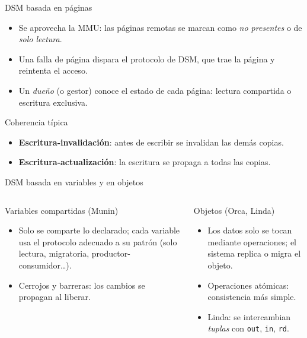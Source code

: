 \documentclass[aspectratio=169,11pt]{beamer}
\begin{document}
\begin{frame}{DSM basada en páginas}
  \begin{itemize}
    \item Se aprovecha la MMU: las páginas remotas se marcan como \emph{no presentes} o de \emph{solo lectura}.
    \item Una falla de página dispara el protocolo de DSM, que trae la página y reintenta el acceso.
    \item Un \emph{dueño} (o gestor) conoce el estado de cada página: lectura compartida o escritura exclusiva.
  \end{itemize}
  \begin{block}{\enspace Coherencia típica}
    \begin{itemize}
      \item \textbf{Escritura-invalidación}: antes de escribir se invalidan las demás copias.
      \item \textbf{Escritura-actualización}: la escritura se propaga a todas las copias.
    \end{itemize}
  \end{block}
\end{frame}

\begin{frame}{DSM basada en variables y en objetos}
  \begin{columns}[T]
    \begin{block}{\faTag\enspace Variables compartidas (Munin)}
      \begin{itemize}
        \item Solo se comparte lo declarado; cada variable usa el protocolo adecuado a su patrón (solo lectura, migratoria, productor-consumidor\ldots).
        \item Cerrojos y barreras: los cambios se propagan al liberar.
      \end{itemize}
    \end{block}
    \begin{block}{\faCubes\enspace Objetos (Orca, Linda)}
      \begin{itemize}
        \item Los datos solo se tocan mediante operaciones; el sistema replica o migra el objeto.
        \item Operaciones atómicas: consistencia más simple.
        \item Linda: se intercambian \emph{tuplas} con \texttt{out}, \texttt{in}, \texttt{rd}.
      \end{itemize}
    \end{block}
  \end{columns}
\end{frame}
\end{document}
